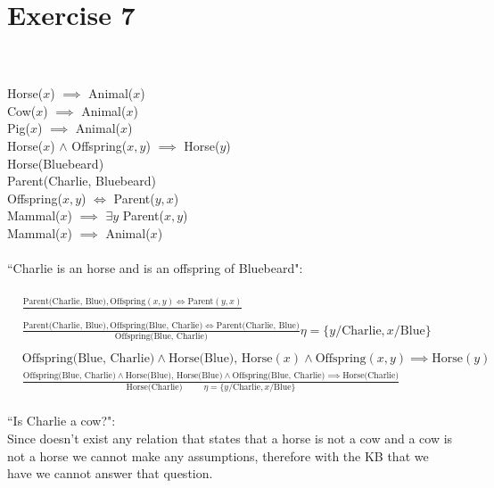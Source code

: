 \documentclass{article}
\begin{document}
\section*{Exercise 7}
\paragraph{}~\\~\\
Horse($x$) $\implies$ Animal($x$)\\
Cow($x$) $\implies$ Animal($x$)\\
Pig($x$) $\implies$ Animal($x$)\\
Horse($x$) $\land$ Offspring($x, y$) $\implies$ Horse($y$)\\
Horse(Bluebeard)\\
Parent(Charlie, Bluebeard)\\
Offspring($x, y$) $\iff$ Parent($y,x$)\\
Mammal($x$) $\implies$ $\exists y$ Parent($x,y$)\\
Mammal($x$) $\implies$ Animal($x$)\\
\\
``Charlie is an horse and is an offspring of Bluebeard":\\
\\
\begin{equation}
\begin{aligned}
& \frac{\text{Parent(Charlie, Blue)}, \text{Offspring}(x,y) \iff \text{Parent}(y,x)}{}\\
& \frac{\text{Parent(Charlie, Blue)}, \text{Offspring(Blue, Charlie)} \iff \text{Parent(Charlie, Blue)}}{ \text{Offspring(Blue, Charlie)}}\eta = \{y/\text{Charlie}, x/\text{Blue}\}\\
&\\
&\text{Offspring(Blue, Charlie)} \land \text{Horse(Blue), } \text{Horse}(x) \land \text{Offspring}(x,y) \implies \text{Horse}(y)\\
&\frac{\text{Offspring(Blue, Charlie)} \land \text{Horse(Blue), } \text{Horse(Blue)} \land \text{Offspring(Blue, Charlie)} \implies \text{Horse(Charlie)}}{\text{Horse(Charlie)}~~~~~~~~~~~\eta = \{y/\text{Charlie}, x/\text{Blue}\}}
\end{aligned}
\end{equation}
\\
``Is Charlie a cow?":\\
Since doesn't exist any relation that states that a horse is not a cow and a cow is not a horse we cannot make any assumptions, therefore with the KB that we have we cannot answer that question.
\end{document}
